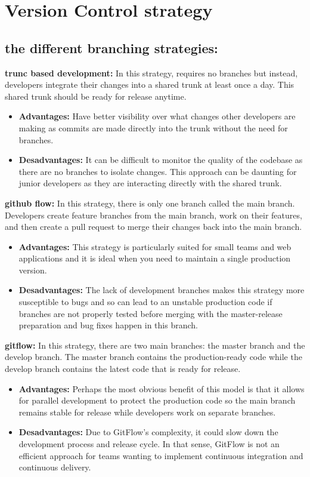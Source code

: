 \section{Version Control strategy}
\subsection*{the different branching strategies\cite{webArticle3}:}
\textbf{trunc based development:} In this strategy, requires no branches but instead, developers integrate their changes into a shared trunk at least once a day. This shared trunk should be ready for release anytime.
\begin{itemize}
    \item \textbf{Advantages:} Have better visibility over what changes other developers are making as commits are made directly into the trunk without the need for branches.
    \item \textbf{Desadvantages:} It can be difficult to monitor the quality of the codebase as there are no branches to isolate changes. This approach can be daunting for junior developers as they are interacting directly with the shared trunk.
\end{itemize}
\par
\textbf{github flow:} In this strategy, there is only one branch called the main branch. Developers create feature branches from the main branch, work on their features, and then create a pull request to merge their changes back into the main branch.
\begin{itemize}
    \item \textbf{Advantages:} This strategy is particularly suited for small teams and web applications and it is ideal when you need to maintain a single production version.
    \item \textbf{Desadvantages:} The lack of development branches makes this strategy more susceptible to bugs and so can lead to an unstable production code if branches are not properly tested before merging with the master-release preparation and bug fixes happen in this branch.
\end{itemize}
\par
\textbf{gitflow:} In this strategy, there are two main branches: the master branch and the develop branch. The master branch contains the production-ready code while the develop branch contains the latest code that is ready for release.
\begin{itemize}
    \item \textbf{Advantages:} Perhaps the most obvious benefit of this model is that it allows for parallel development to protect the production code so the main branch remains stable for release while developers work on separate branches.
    \item \textbf{Desadvantages:} Due to GitFlow's complexity, it could slow down the development process and release cycle. In that sense, GitFlow is not an efficient approach for teams wanting to implement continuous integration and continuous delivery.
\end{itemize}
